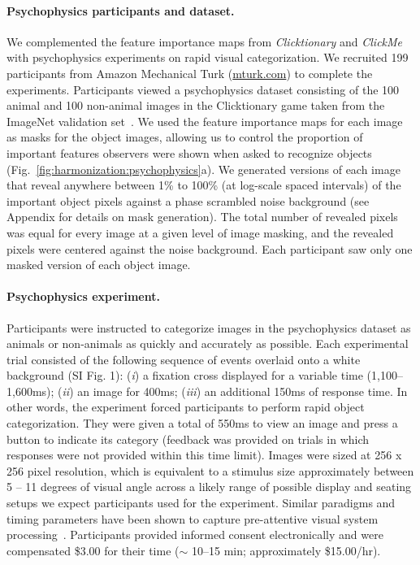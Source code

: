 \paragraph{Psychophysics participants and dataset.} We complemented the feature importance maps from \textit{Clicktionary} and \textit{ClickMe} with psychophysics experiments on rapid visual categorization. We recruited 199 participants from Amazon Mechanical Turk (\url{mturk.com}) to complete the experiments. Participants viewed a psychophysics dataset consisting of the 100 animal and 100 non-animal images in the Clicktionary game taken from the ImageNet validation set~\cite{Linsley2017-qe}. We used the feature importance maps for each image as masks for the object images, allowing us to control the proportion of important features observers were shown when asked to recognize objects (Fig.~\ref{fig:harmonization:psychophysics}a). We generated versions of each image that reveal anywhere between 1\% to 100\% (at log-scale spaced intervals) of the important object pixels against a phase scrambled noise background (see Appendix  for details on mask generation). The total number of revealed pixels was equal for every image at a given level of image masking, and the revealed pixels were centered against the noise background. Each participant saw only one masked version of each object image.

\paragraph{Psychophysics experiment.} Participants were instructed to categorize images in the psychophysics dataset as animals or non-animals as quickly and accurately as possible. Each experimental trial consisted of the following sequence of events overlaid onto a white background (SI Fig. 1): (\textit{i}) a fixation cross displayed for a variable time (1,100–1,600ms); (\textit{ii}) an image for 400ms; (\textit{iii}) an additional 150ms of response time. In other words, the experiment forced participants to perform rapid object categorization. They were given a total of 550ms to view an image and press a button to indicate its category (feedback was provided on trials in which responses were not provided within this time limit). Images were sized at 256 x 256 pixel resolution, which is equivalent to a stimulus size approximately between 5 -- 11 degrees of visual angle across a likely range of possible display and seating setups we expect participants used for the experiment. Similar paradigms and timing parameters have been shown to capture pre-attentive visual system processing~\cite{Eberhardt2016-cw, Kirchner2006-xc, Fabre-Thorpe2011-js, Muriel2007-co}. Participants provided informed consent electronically and were compensated \$3.00 for their time ($\sim$ 10--15 min; approximately \$15.00/hr).

